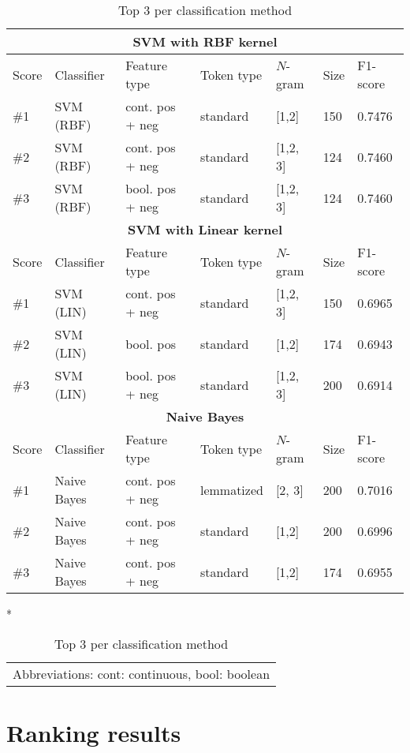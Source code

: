 \begin{table}[H]
\begin{tabular}{|l|l|l|l|l|l|l|}
\hline
\multicolumn{7}{|c|}{\textbf{SVM with RBF kernel}}\\
\hline
Score & Classifier & Feature type & Token type & $N$-gram & Size & F1-score\\
\hline
\#1 & SVM (RBF) & cont. pos + neg  & standard  & [1,2]  & 150 & 0.7476\\
\#2 & SVM (RBF) & cont. pos + neg  & standard  & [1,2, 3] &  124 & 0.7460 \\
\#3 & SVM (RBF) & bool. pos + neg  & standard  & [1,2, 3] &  124 & 0.7460 \\

\hline
\multicolumn{7}{|c|}{\textbf{SVM with Linear kernel}}\\
\hline
Score & Classifier & Feature type & Token type & $N$-gram & Size & F1-score\\
\hline
\#1 & SVM (LIN) & cont. pos + neg  & standard  & [1,2, 3]  & 150 & 0.6965\\
\#2 & SVM (LIN) & bool. pos  & standard  & [1,2] &  174 & 0.6943 \\
\#3 & SVM (LIN) & bool. pos + neg  & standard  & [1,2, 3] &  200 & 0.6914  \\

\hline
\multicolumn{7}{|c|}{\textbf{Naive Bayes}}\\
\hline
Score & Classifier & Feature type & Token type & $N$-gram & Size & F1-score\\
\hline
\#1 & Naive Bayes & cont. pos + neg  & lemmatized  & [2, 3]  & 200 & 0.7016\\
\#2 & Naive Bayes & cont. pos + neg  & standard  & [1,2] &  200 & 0.6996 \\
\#3 & Naive Bayes & cont. pos + neg  & standard  & [1,2] &  174 & 0.6955 \\

\hline
\end{tabular}
\caption{Top 3 per classification method}*{
   \begin{tabular}{c}
   	Abbreviations:
   cont: continuous, bool: boolean\\
   \end{tabular}
 }
\label{table:top_clf}
\end{table}

\section{Ranking results}

